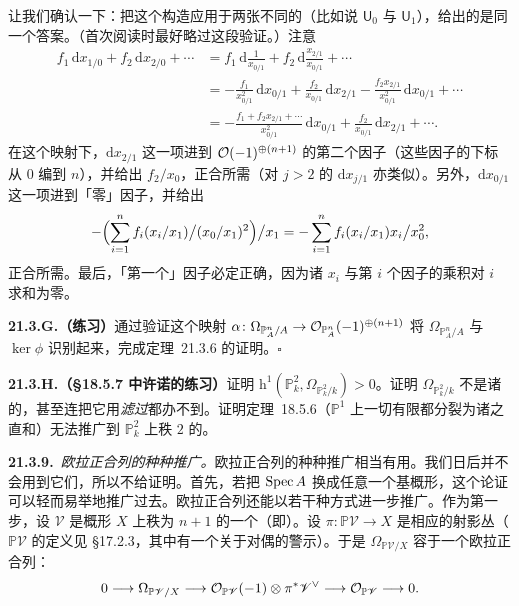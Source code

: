 让我们确认一下：把这个构造应用于两张不同的\trCoordinatePatch（比如说 $\mathsf{U}_0$ 与 $\mathsf{U}_1$），给出的是同一个答案。（首次阅读时最好略过这段验证。）注意
\[
\begin{aligned}
f_1\,\mathrm{d}x_{1/0}+f_2\,\mathrm{d}x_{2/0}+\cdots&=f_1\,\mathrm{d}\frac{1}{x_{0/1}}+f_2\,\mathrm{d}\frac{x_{2/1}}{x_{0/1}}+\cdots\\
&=-\frac{f_1}{x_{0/1}^2}\,\mathrm{d}x_{0/1}+\frac{f_2}{x_{0/1}}\,\mathrm{d}x_{2/1}-\frac{f_2x_{2/1}}{x_{0/1}^2}\,\mathrm{d}x_{0/1}+\cdots\\
&=-\frac{f_1+f_2x_{2/1}+\cdots}{x_{0/1}^2}\,\mathrm{d}x_{0/1}+\frac{f_2}{x_{0/1}}\,\mathrm{d}x_{2/1}+\cdots.
\end{aligned}
\]
在这个映射下，$\mathrm{d}x_{2/1}$ 这一项进到 $\mathcal{O}(-1)^{\oplus(n+1)}$ 的第二个因子（这些因子的下标从 $0$ 编到 $n$），并给出 $f_2/x_0$，正合所需（对 $j>2$ 的 $\mathrm{d}x_{j/1}$ 亦类似）。另外，$\mathrm{d}x_{0/1}$ 这一项进到「零」因子，并给出
\[
-\Bigl(\sum_{i=1}^n f_i(x_i/x_1)\big/(x_0/x_1)^2\Bigr)\big/x_1=-\sum_{i=1}^n f_i(x_i/x_1)x_i\big/x_0^2,
\]
正合所需。最后，「第一个」因子必定正确，因为诸 $x_i$ 与第 $i$ 个因子的乘积对 $i$ 求和为零。

\textbf{21.3.G.（练习）}\quad 通过验证这个映射 $\alpha\colon\Omega_{\mathbb{P}^n_A/A}\to\mathcal{O}_{\mathbb{P}^n_A}(-1)^{\oplus(n+1)}$ 将 $\Omega_{\mathbb{P}^n_A/A}$ 与 $\ker\phi$ 识别起来，完成\mbox{定理~21.3.6} 的证明。\hfill$\square$

\textbf{21.3.H.（\S18.5.7 中许诺的练习）}\quad 证明 $\mathrm{h}^1(\mathbb{P}^2_k,\Omega_{\mathbb{P}^2_k/k})>0$。证明 $\Omega_{\mathbb{P}^2_k/k}$ 不是诸\trLineBundle{}的\trDirectSum，甚至连把它用\trLineBundle{}\emph{滤过}都办不到。证明\mbox{定理~18.5.6}（$\mathbb{P}^1$ 上一切有限\trRank{}\trVectorBundle{}都分裂为诸\trLineBundle{}之直和）无法推广到 $\mathbb{P}^2_k$ 上秩 $2$ 的\trVectorBundle。

\textbf{21.3.9.}\ \emph{欧拉正合列的种种推广。}\quad 欧拉正合列的种种推广相当有用。我们日后并不会用到它们，所以不给证明。首先，若把 $\operatorname{Spec} A$ 换成任意一个基概形，这个论证可以轻而易举地推广过去。欧拉正合列还能以若干种方式进一步推广。作为第一步，设 $\mathscr{V}$ 是概形 $X$ 上秩为 $n+1$ 的一个\trLocallyFreeSheaf（即\trVectorBundle）。设 $\pi\colon\mathbb{P}\mathscr{V}\to X$ 是相应的射影丛（$\mathbb{P}\mathscr{V}$ 的定义见 \S17.2.3，其中有一个关于对偶的警示）。于是 $\Omega_{\mathbb{P}\mathscr{V}/X}$ 容于一个欧拉正合列：
\[
0\longrightarrow\Omega_{\mathbb{P}\mathscr{V}/X}\longrightarrow\mathcal{O}_{\mathbb{P}\mathscr{V}}(-1)\otimes\pi^*\mathscr{V}^{\vee}\longrightarrow\mathcal{O}_{\mathbb{P}\mathscr{V}}\longrightarrow 0.
\]

